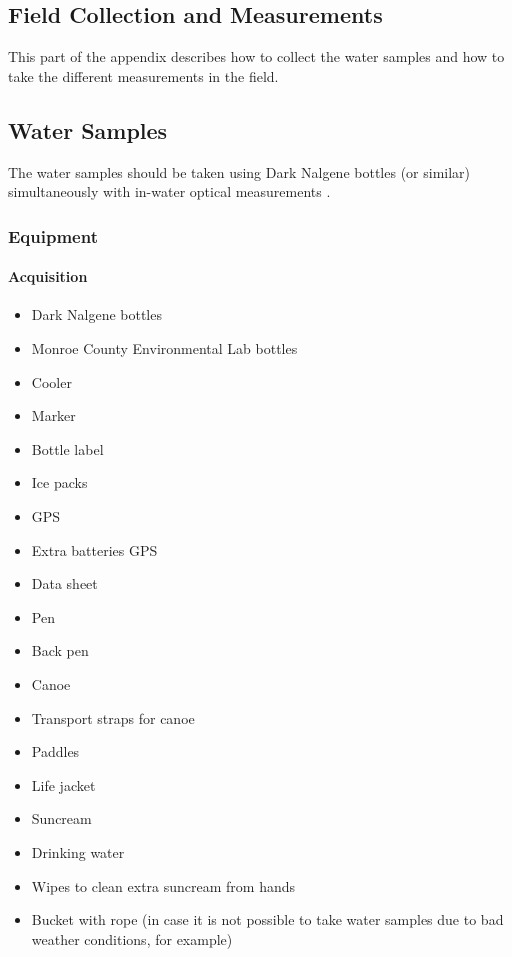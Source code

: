 \begin{appendices}
\chapter{Field Collection and Measurements}
\label{ch:fieldmea}

This part of the appendix describes how to collect the water samples and how to take the different measurements in the field.
\section{Water Samples}
The water samples should be taken using Dark Nalgene bottles (or similar) simultaneously with in-water optical measurements \cite{Mitchell2002}.

\subsection{Equipment}
\subsubsection*{Acquisition}

\begin{multicols}{3}
\begin{itemize}[itemsep=2pt,parsep=2pt]
  \item Dark Nalgene bottles
  \item Monroe County Environmental Lab bottles
  \item Cooler
  \item Marker
  \item Bottle label
  \item Ice packs
  \item GPS
  \item Extra batteries GPS
  \item Data sheet
  \item Pen
  \item Back pen
  \item Canoe 
  \item Transport straps for canoe
  \item Paddles
  \item Life jacket
  \item Suncream 
  \item Drinking water
  \item Wipes to clean extra suncream from hands
  \item Bucket with rope (in case it is not possible to take water samples due to bad weather conditions, for example)
\end{itemize}
\end{multicols}


\end{appendices}
